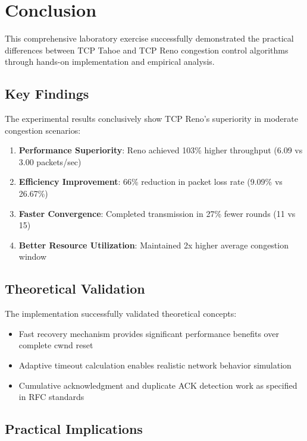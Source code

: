 \documentclass[12pt]{article}
\begin{document}
\section{Conclusion}

This comprehensive laboratory exercise successfully demonstrated the practical differences between TCP Tahoe and TCP Reno congestion control algorithms through hands-on implementation and empirical analysis.

\subsection{Key Findings}

The experimental results conclusively show TCP Reno's superiority in moderate congestion scenarios:

\begin{enumerate}
    \item \textbf{Performance Superiority}: Reno achieved 103\% higher throughput (6.09 vs 3.00 packets/sec)
    \item \textbf{Efficiency Improvement}: 66\% reduction in packet loss rate (9.09\% vs 26.67\%)
    \item \textbf{Faster Convergence}: Completed transmission in 27\% fewer rounds (11 vs 15)
    \item \textbf{Better Resource Utilization}: Maintained 2x higher average congestion window
\end{enumerate}

\subsection{Theoretical Validation}

The implementation successfully validated theoretical concepts:
\begin{itemize}
    \item Fast recovery mechanism provides significant performance benefits over complete cwnd reset
    \item Adaptive timeout calculation enables realistic network behavior simulation
    \item Cumulative acknowledgment and duplicate ACK detection work as specified in RFC standards
\end{itemize}

\subsection{Practical Implications}
\end{document}

